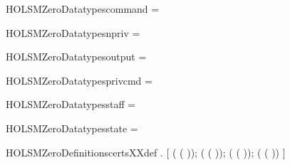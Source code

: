\newcommand{\HOLSMZeroDate}{15 March 2020}
\newcommand{\HOLSMZeroTime}{23:41}
\begin{SaveVerbatim}{HOLSMZeroDatatypescommand}
 =   \HOLTokenBar{}  
\end{SaveVerbatim}
\newcommand{\HOLSMZeroDatatypescommand}{\UseVerbatim{HOLSMZeroDatatypescommand}}
\begin{SaveVerbatim}{HOLSMZeroDatatypesnpriv}
 = 
\end{SaveVerbatim}
\newcommand{\HOLSMZeroDatatypesnpriv}{\UseVerbatim{HOLSMZeroDatatypesnpriv}}
\begin{SaveVerbatim}{HOLSMZeroDatatypesoutput}
 =  \HOLTokenBar{} 
\end{SaveVerbatim}
\newcommand{\HOLSMZeroDatatypesoutput}{\UseVerbatim{HOLSMZeroDatatypesoutput}}
\begin{SaveVerbatim}{HOLSMZeroDatatypesprivcmd}
 =  \HOLTokenBar{} 
\end{SaveVerbatim}
\newcommand{\HOLSMZeroDatatypesprivcmd}{\UseVerbatim{HOLSMZeroDatatypesprivcmd}}
\begin{SaveVerbatim}{HOLSMZeroDatatypesstaff}
 =  \HOLTokenBar{}  \HOLTokenBar{} 
\end{SaveVerbatim}
\newcommand{\HOLSMZeroDatatypesstaff}{\UseVerbatim{HOLSMZeroDatatypesstaff}}
\begin{SaveVerbatim}{HOLSMZeroDatatypesstate}
 =  \HOLTokenBar{} 
\end{SaveVerbatim}
\newcommand{\HOLSMZeroDatatypesstate}{\UseVerbatim{HOLSMZeroDatatypesstate}}
\newcommand{\HOLSMZeroDatatypes}{
\HOLSMZeroDatatypescommand\HOLSMZeroDatatypesnpriv\HOLSMZeroDatatypesoutput\HOLSMZeroDatatypesprivcmd\HOLSMZeroDatatypesstaff\HOLSMZeroDatatypesstate}
\begin{SaveVerbatim}{HOLSMZeroDefinitionscertsXXdef}
\HOLTokenTurnstile{} \HOLSymConst{\HOLTokenForall{}}  .
         \HOLSymConst{=}
     [    ( ( ));
          ( ( ));
          ( ( ));
          ( ( ))   ]
\end{SaveVerbatim}
